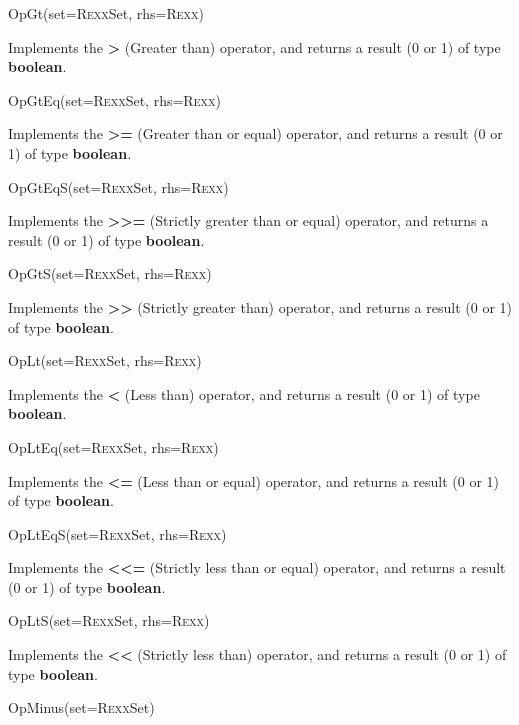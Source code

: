 \begin{description}
\item{OpGt(set=R\textsc{exx}Set, rhs=R\textsc{exx})}

Implements the \nr{} \textbf{\textbf{>}} (Greater than)
operator, and returns a result (0 or 1) of type \textbf{boolean}.

\item{OpGtEq(set=R\textsc{exx}Set, rhs=R\textsc{exx})}

Implements the \nr{} \textbf{\textbf{>=}} (Greater than or equal)
operator, and returns a result (0 or 1) of type \textbf{boolean}.
\item{OpGtEqS(set=R\textsc{exx}Set, rhs=R\textsc{exx})}

Implements the \nr{} \textbf{\textbf{>>=}} (Strictly greater than
or equal) operator, and returns a result (0 or 1) of
type \textbf{boolean}.
\item{OpGtS(set=R\textsc{exx}Set, rhs=R\textsc{exx})}

Implements the \nr{} \textbf{\textbf{>>}} (Strictly greater than)
operator, and returns a result (0 or 1) of type \textbf{boolean}.
\item{OpLt(set=R\textsc{exx}Set, rhs=R\textsc{exx})}

Implements the \nr{} \textbf{\textbf{<}} (Less than)
operator, and returns a result (0 or 1) of type \textbf{boolean}.
\item{OpLtEq(set=R\textsc{exx}Set, rhs=R\textsc{exx})}

Implements the \nr{} \textbf{\textbf{<=}} (Less than or equal)
operator, and returns a result (0 or 1) of type \textbf{boolean}.
\item{OpLtEqS(set=R\textsc{exx}Set, rhs=R\textsc{exx})}

Implements the \nr{} \textbf{\textbf{<<=}} (Strictly less than
or equal) operator, and returns a result (0 or 1) of
type \textbf{boolean}.
\item{OpLtS(set=R\textsc{exx}Set, rhs=R\textsc{exx})}

Implements the \nr{} \textbf{\textbf{<<}} (Strictly less than)
operator, and returns a result (0 or 1) of type \textbf{boolean}.
\item{OpMinus(set=R\textsc{exx}Set)}


\end{description}
